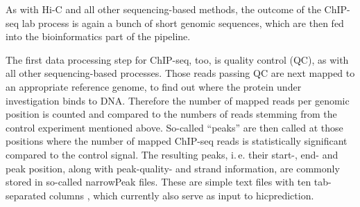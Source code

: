 As with Hi-C and all other sequencing-based methods, the outcome of the ChIP-seq lab process is
again a bunch of short genomic sequences, which are then fed into the bioinformatics part of the pipeline.

The first data processing step for ChIP-seq, too, is quality control (QC), as with all other sequencing-based processes. 
Those reads passing QC are next mapped to an appropriate reference genome, 
to find out where the protein under investigation binds to DNA.
Therefore the number of mapped reads per genomic position is counted and compared 
to the numbers of reads stemming from the control experiment mentioned above. 
So-called ``peaks'' are then called at those positions where the number of mapped ChIP-seq reads is
statistically significant compared to the control signal. 
The resulting peaks, i.\,e. their start-, end- and peak position, 
along with peak-quality- and strand information, 
are commonly stored in so-called narrowPeak files.
These are simple text files with ten tab-separated columns \cite{UniCaliforniaSantaCruz2020}, which currently also serve as input to hicprediction.


